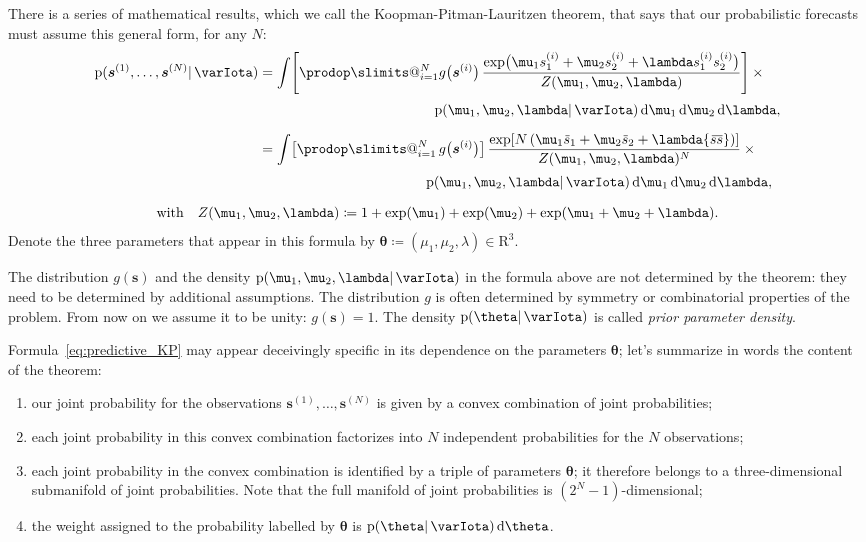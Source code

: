 \documentclass[\ifafour a4paper,12pt,\else a5paper,10pt,\fi%
onecolumn,oneside,article,%
british%
]{memoir}
\makeatletter
\theoremstyle{remark}
\theoremstyle{innote}
\def\prod{\DOTSI\prodop\slimits@}
\newcommand*{\di}{\mathrm{d}}%
\newcommand*{\RR}{\bm{\mathrm{R}}}
\newcommand*{\defd}{\coloneqq}
\newcommand*{\pf}{\mathrm{p}}%
\renewcommand*{\|}{\mathpunct{|}}
\newcommand*{\tprod}{\mathop{\textstyle\prod}\nolimits}
\newcommand*{\widebar}[1]{{\mkern1.5mu\skew{2}\overline{\mkern-1.5mu#1\mkern-1.5mu}\mkern 1.5mu}}
\newcommand*{\yI}{\varIota}
\newcommand*{\ys}{\bm{s}}
\newcommand*{\yso}[1]{\ys^{(#1)}}
\newcommand*{\ysso}[1]{s^{(#1)}}
\newcommand*{\la}{\lambda}
\newcommand*{\yth}{\bm{\theta}}
\newcommand*{\yavv}{\widebar{s}}
\newcommand*{\ycv}{\widebar{ss}}
\makeatother
\begin{document}
There is a series of mathematical results, which we call the
Koopman-Pitman-Lauritzen theorem, that says that our probabilistic
forecasts must assume this general form, for any $N$:
\begin{multline}
  \label{eq:predictive_KP}
\begin{aligned}
    \pf(\yso{1}, \dotsc, \yso{N} \|\yI )
  &=\!\!
    \begin{multlined}[t][0.7\linewidth]
\int
\Biggl[  \prod_{i=1}^{N}
  g\bigl(\yso{i}\bigr)\,
  \frac{  \exp\bigl(
    \mu_1 \ysso{i}_1 + \mu_2 \ysso{i}_2 + \la \ysso{i}_1 \ysso{i}_2
    \bigr) }{Z(\mu_1,\mu_2,\la)}
  \Biggr]\times{}\\[\jot]
  \pf(\mu_1,\mu_2,\la \| \yI) \, \di\mu_1\,\di\mu_2\,\di\la,
\end{multlined}
\\[2\jot]
  &=\!\!
        \begin{multlined}[t][0.7\linewidth]
\int
  \bigl[\tprod_{i=1}^{N}g\bigl(\yso{i}\bigr) \bigr]\,
  \frac{  \exp[N \, (
    \mu_1 \yavv_1 + \mu_2 \yavv_2 + \la \ycv)]}{Z(\mu_1,\mu_2,\la)^N}
  \times{}\\[\jot]
  \pf(\mu_1,\mu_2,\la \| \yI) \, \di\mu_1\,\di\mu_2\,\di\la,
\end{multlined}
\end{aligned}
\\[2\jot]
  \text{with}\quad
  Z(\mu_1,\mu_2,\la) \defd
  1+ \exp(\mu_1) + \exp(\mu_2) + \exp(\mu_1+\mu_2+\la).
\end{multline}
Denote the three parameters that appear in this formula by
$\yth \defd (\mu_1, \mu_2, \la)\in \RR^3$.

The distribution $g(\ys)$ and the density $\pf(\mu_1,\mu_2,\la \| \yI)$ in
the formula above are not determined by the theorem: they need to be
determined by additional assumptions. The distribution $g$ is often
determined by symmetry or combinatorial properties of the problem.
From now on we assume it to be unity: $g(\ys)=1$. The density
$\pf(\yth \|\yI)$ is called \emph{prior parameter density}.

Formula~\eqref{eq:predictive_KP} may appear deceivingly specific in its
dependence on the parameters $\yth$; let's summarize in words the content
of the theorem:
\begin{enumerate}[label=(\textit{\alph*})]
\item our joint probability for the observations $\yso{1}, \dotsc,\yso{N}$
  is given by a convex combination of joint probabilities;
\item each joint probability in this convex combination factorizes into
  $N$ independent probabilities for the $N$ observations;
\item\label{item:submanifold}each joint probability in the convex
  combination is identified by a triple of parameters $\yth$; it therefore
  belongs to a three-dimensional submanifold of joint probabilities. Note
  that the full manifold of joint probabilities is $(2^N-1)$-dimensional;
\item\label{item:weights}the weight assigned to the probability labelled by
  $\yth$ is $\pf(\yth \|\yI)\,\di\yth$.
\end{enumerate}
\end{document}
